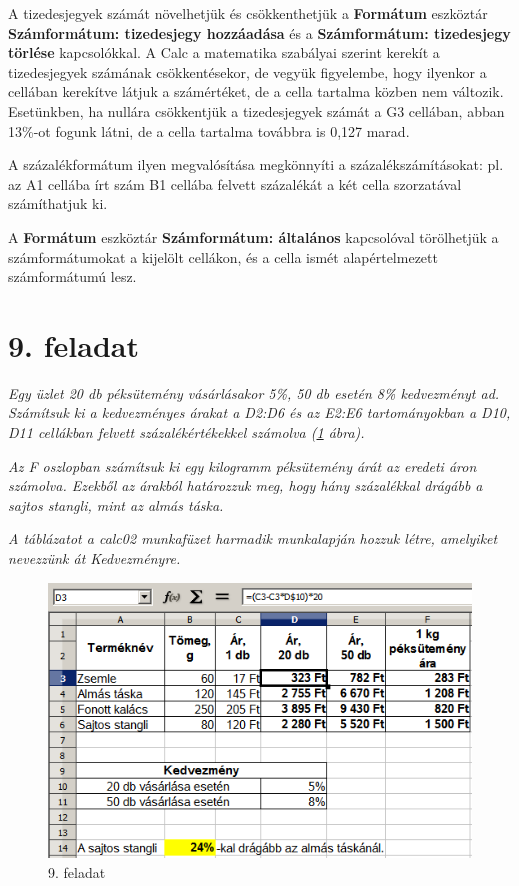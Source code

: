 A tizedesjegyek számát növelhetjük és csökkenthetjük a
\textbf{Formátum} eszköztár \textbf{Számformátum: tizedesjegy
hozzáadása} és a \textbf{Számformátum: tizedesjegy
törlése} kapcsolókkal. A Calc a matematika szabályai szerint
kerekít a tizedesjegyek számának csökkentésekor, de vegyük
figyelembe, hogy ilyenkor a cellában kerekítve látjuk a
számértéket, de a cella tartalma közben nem változik.
Esetünkben, ha nullára csökkentjük a tizedesjegyek számát a
G3 cellában, abban 13\%-ot fogunk látni, de a cella tartalma
továbbra is 0,127 marad.

A százalékformátum ilyen megvalósítása megkönnyíti a
százalékszámításokat: pl. az A1 cellába írt szám B1
cellába felvett százalékát a két cella szorzatával
számíthatjuk ki.

A \textbf{Formátum} eszköztár \textbf{Számformátum:
általános} kapcsolóval törölhetjük a számformátumokat a
kijelölt cellákon, és a cella ismét alapértelmezett
számformátumú lesz.


\section{9. feladat}
{\itshape
Egy üzlet 20 db péksütemény vásárlásakor 5\%, 50 db
esetén 8\% kedvezményt ad. Számítsuk ki a kedvezményes
árakat a D2:D6 és az E2:E6 tartományokban a D10, D11 cellákban
felvett százalékértékekkel számolva (\ref{9-feladat} ábra).}

{\itshape
Az F oszlopban számítsuk ki egy kilogramm péksütemény árát
az eredeti áron számolva. Ezekből az árakból határozzuk
meg, hogy hány százalékkal drágább a sajtos stangli, mint az
almás táska.}

{\itshape
A táblázatot a calc02 munkafüzet harmadik munkalapján hozzuk
létre, amelyiket nevezzünk át Kedvezményre.}

\begin{figure}[!h]
\begin{center}
\includegraphics[width=12.857cm]{oocalcv2-img44.png}
\caption{9. feladat}\label{9-feladat}
\end{center}
\end{figure}


